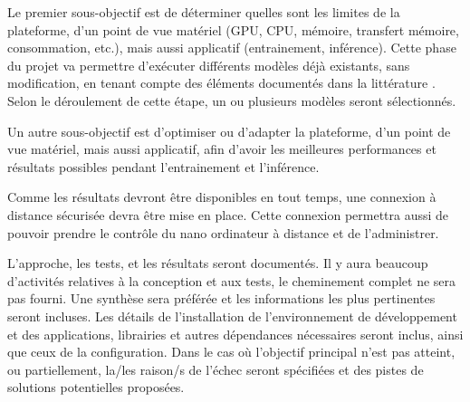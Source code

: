 ﻿\par Le premier sous-objectif est de déterminer quelles sont les limites de la plateforme, d'un point de vue matériel (GPU, CPU, mémoire, transfert mémoire, consommation, etc.), mais aussi applicatif (entrainement, inférence). Cette phase du projet va permettre d'exécuter différents modèles déjà existants, sans  modification, en tenant compte des éléments documentés dans la littérature \cite{nguyen_mavnet_2019} \cite{jia_real-time_2020} \cite{nvidia_jetson_2019-1}. Selon le déroulement de cette étape, un ou plusieurs modèles seront sélectionnés. 
\par Un autre sous-objectif est d'optimiser ou d'adapter la plateforme, d'un point de vue matériel, mais aussi applicatif, afin d'avoir les meilleures performances et résultats possibles pendant l'entrainement et l'inférence.
\par Comme les résultats devront être disponibles en tout temps, une connexion à distance sécurisée devra être mise en place. Cette connexion permettra aussi de pouvoir prendre le contrôle du nano ordinateur à distance et de l'administrer.
\par L'approche, les tests, et les résultats seront documentés. Il y aura beaucoup d'activités relatives à la conception et aux tests, le cheminement complet ne sera pas fourni. Une synthèse sera préférée et les informations les plus pertinentes seront incluses. Les détails de l'installation de l'environnement de développement et des applications, librairies et autres dépendances nécessaires seront inclus, ainsi que ceux de la configuration. Dans le cas où l'objectif principal n'est pas atteint, ou partiellement, la/les raison/s de l'échec seront spécifiées et des pistes de solutions potentielles proposées.